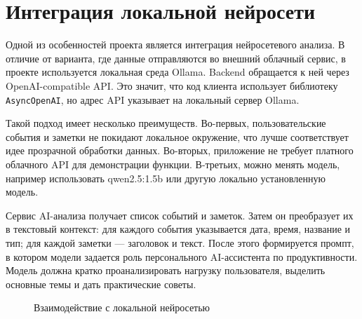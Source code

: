 \documentclass[14pt,a4paper]{extreport}
\begin{document}
\section{Интеграция локальной нейросети}

Одной из особенностей проекта является интеграция нейросетевого анализа. В отличие от варианта, где данные отправляются во внешний облачный сервис, в проекте используется локальная среда Ollama. Backend обращается к ней через OpenAI-compatible API. Это значит, что код клиента использует библиотеку \texttt{AsyncOpenAI}, но адрес API указывает на локальный сервер Ollama.

Такой подход имеет несколько преимуществ. Во-первых, пользовательские события и заметки не покидают локальное окружение, что лучше соответствует идее прозрачной обработки данных. Во-вторых, приложение не требует платного облачного API для демонстрации функции. В-третьих, можно менять модель, например использовать qwen2.5:1.5b или другую локально установленную модель.

Сервис AI-анализа получает список событий и заметок. Затем он преобразует их в текстовый контекст: для каждого события указывается дата, время, название и тип; для каждой заметки --- заголовок и текст. После этого формируется промпт, в котором модели задается роль персонального AI-ассистента по продуктивности. Модель должна кратко проанализировать нагрузку пользователя, выделить основные темы и дать практические советы.

\begin{figure}[H]
\centering
{}
\caption{Взаимодействие с локальной нейросетью}
\end{figure}
\end{document}
